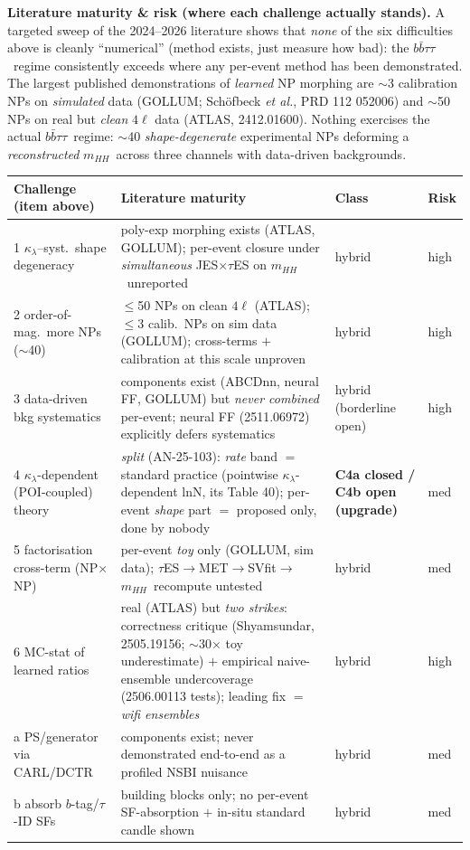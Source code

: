 \documentclass[11pt]{article}
\newcommand{\kl}{\ensuremath{\kappa_\lambda}}
\newcommand{\mhh}{\ensuremath{m_{HH}}}
\newcommand{\bbtt}{\ensuremath{b\bar b\tau\tau}}
\begin{document}
\medskip\noindent\textbf{Literature maturity \& risk (where each challenge actually stands).} A targeted sweep of the
2024--2026 literature shows that \emph{none} of the six difficulties above is cleanly ``numerical'' (method exists,
just measure how bad): the \bbtt\ regime consistently exceeds where any per-event method has been demonstrated. The
largest published demonstrations of \emph{learned} NP morphing are $\sim$3 calibration NPs on \emph{simulated} data
(GOLLUM; Schöfbeck \emph{et al.}, PRD 112 052006) and $\sim$50 NPs on real but \emph{clean} $4\ell$ data (ATLAS,
2412.01600). Nothing exercises the actual \bbtt\ regime: $\sim$40 \emph{shape-degenerate} experimental NPs deforming
a \emph{reconstructed} \mhh\ across three channels with data-driven backgrounds.

\begin{table}[h]\centering\small
\begin{tabular}{@{}p{}p{}p{}p{}@{}}
\toprule
\textbf{Challenge (item above)} & \textbf{Literature maturity} & \textbf{Class} & \textbf{Risk}\\
\midrule
1 \kl--syst.\ shape degeneracy & poly-exp morphing exists (ATLAS, GOLLUM); per-event closure under \emph{simultaneous} JES$\times\tau$ES on \mhh\ unreported & hybrid & high\\
2 order-of-mag.\ more NPs ($\sim$40) & $\le$50 NPs on clean $4\ell$ (ATLAS); $\le$3 calib.\ NPs on sim data (GOLLUM); cross-terms $+$ calibration at this scale unproven & hybrid & high\\
3 data-driven bkg systematics & components exist (ABCDnn, neural FF, GOLLUM) but \emph{never combined} per-event; neural FF (2511.06972) explicitly defers systematics & hybrid (borderline open) & high\\
4 \kl-dependent (POI-coupled) theory & \emph{split} (AN-25-103): \emph{rate} band $=$ standard practice (pointwise \kl-dependent lnN, its Table 40); per-event \emph{shape} part $=$ proposed only, done by nobody & \textbf{C4a closed / C4b open (upgrade)} & med\\
5 factorisation cross-term (NP$\times$NP) & per-event \emph{toy} only (GOLLUM, sim data); $\tau$ES$\to$MET$\to$SVfit$\to$\mhh\ recompute untested & hybrid & med\\
6 MC-stat of learned ratios & real (ATLAS) but \emph{two strikes}: correctness critique (Shyamsundar, 2505.19156; $\sim$30$\times$ toy underestimate) $+$ empirical naive-ensemble undercoverage (2506.00113 tests); leading fix $=$ \emph{wifi ensembles} & hybrid & high\\
a PS/generator via CARL/DCTR & components exist; never demonstrated end-to-end as a profiled NSBI nuisance & hybrid & med\\
b absorb $b$-tag/$\tau$-ID SFs & building blocks only; no per-event SF-absorption $+$ in-situ standard candle shown & hybrid & med\\
\bottomrule
\end{tabular}
\end{table}
\end{document}

